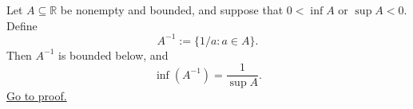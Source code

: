 \begin{theorem}
\label{thm:infimum-reciprocal-set}
Let $A\subseteq\mathbb{R}$ be nonempty and bounded, and suppose that
$0<\inf A$ or $\sup A<0$.  Define
\[
  A^{-1}:=\{1/a:a\in A\}.
\]
Then $A^{-1}$ is bounded below, and
\[
  \inf(A^{-1})=\frac{1}{\sup A}.
\]
\hyperref[prf:infimum-reciprocal-set]{Go to proof.}
\end{theorem}